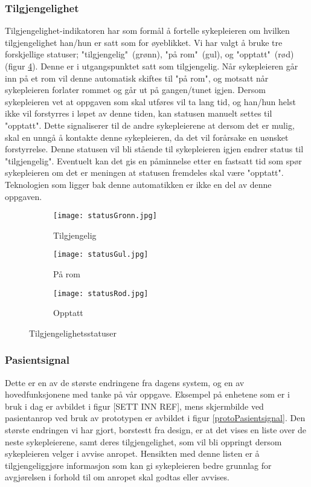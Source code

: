 \subsubsection{Tilgjengelighet}
Tilgjengelighet-indikatoren har som formål å fortelle sykepleieren om hvilken tilgjengelighet han/hun er satt som for øyeblikket. Vi har valgt å bruke tre forskjellige statuser; "tilgjengelig"\ (grønn), "på rom"\ (gul), og "opptatt"\ (rød) (figur \ref{tilgjengelighetsstatuser}). Denne er i utgangspunktet satt som tilgjengelig. Når sykepleieren går inn på et rom vil denne automatisk skiftes til "på rom", og motsatt når sykepleieren forlater rommet og går ut på gangen/tunet igjen. Dersom sykepleieren vet at oppgaven som skal utføres vil ta lang tid, og han/hun helst ikke vil forstyrres i løpet av denne tiden, kan statusen manuelt settes til "opptatt". Dette signaliserer til de andre sykepleierene at dersom det er mulig, skal en unngå å kontakte denne sykepleieren, da det vil forårsake en uønsket forstyrrelse. Denne statusen vil bli stående til sykepleieren igjen endrer status til "tilgjengelig". Eventuelt kan det gis en påminnelse etter en fastsatt tid som spør sykepleieren om det er meningen at statusen fremdeles skal være "opptatt". Teknologien som ligger bak denne automatikken er ikke en del av denne oppgaven.

\begin{figure}
	\centering
	\begin{subfigure}[b]{0.3\textwidth}
		\texttt{[image: statusGronn.jpg]}
		\caption{Tilgjengelig}
		\label{proto_startside}
	\end{subfigure}
	\begin{subfigure}[b]{0.3\textwidth}
		\texttt{[image: statusGul.jpg]}
		\caption{På rom}
		\label{proto_startside}
	\end{subfigure}
	\begin{subfigure}[b]{0.3\textwidth}
		\texttt{[image: statusRod.jpg]}
		\caption{Opptatt}
		\label{proto_startside_medMeny}
	\end{subfigure}
	\caption{Tilgjengelighetsstatuser}
	\label{tilgjengelighetsstatuser}
\end{figure}

\subsubsection{Pasientsignal}
Dette er en av de største endringene fra dagens system, og en av hovedfunksjonene med tanke på vår oppgave. Eksempel på enhetene som er i bruk i dag er avbildet i figur [SETT INN REF], mens skjermbilde ved pasientanrop ved bruk av prototypen er avbildet i figur \ref{protoPasientsignal}. Den største endringen vi har gjort, borstestt fra design, er at det vises en liste over de neste sykepleierene, samt deres tilgjengelighet, som vil bli oppringt dersom sykepleieren velger i avvise anropet. Hensikten med denne listen er å tilgjengeliggjøre informasjon som kan gi sykepleieren bedre grunnlag for avgjørelsen i forhold til om anropet skal godtas eller avvises.

